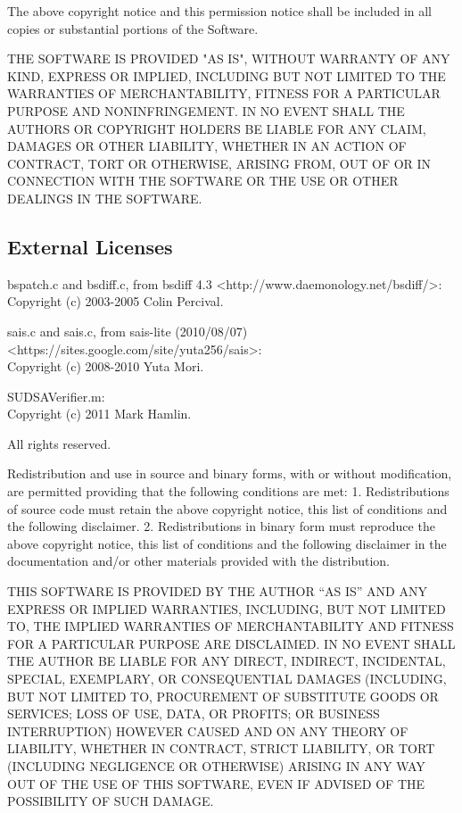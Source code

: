 \documentclass[parskip=half]{scrartcl}
\begin{document}
The above copyright notice and this permission notice shall be included in all
copies or substantial portions of the Software.

THE SOFTWARE IS PROVIDED "AS IS", WITHOUT WARRANTY OF ANY KIND, EXPRESS OR
IMPLIED, INCLUDING BUT NOT LIMITED TO THE WARRANTIES OF MERCHANTABILITY, FITNESS
FOR A PARTICULAR PURPOSE AND NONINFRINGEMENT. IN NO EVENT SHALL THE AUTHORS OR
COPYRIGHT HOLDERS BE LIABLE FOR ANY CLAIM, DAMAGES OR OTHER LIABILITY, WHETHER
IN AN ACTION OF CONTRACT, TORT OR OTHERWISE, ARISING FROM, OUT OF OR IN
CONNECTION WITH THE SOFTWARE OR THE USE OR OTHER DEALINGS IN THE SOFTWARE.


\subsection*{External Licenses}

bspatch.c and bsdiff.c, from bsdiff 4.3 <http://www.daemonology.net/bsdiff/>:\\
Copyright (c) 2003-2005 Colin Percival.

sais.c and sais.c, from sais-lite (2010/08/07) <https://sites.google.com/site/yuta256/sais>:\\
Copyright (c) 2008-2010 Yuta Mori.

SUDSAVerifier.m:\\
Copyright (c) 2011 Mark Hamlin.

All rights reserved.

Redistribution and use in source and binary forms, with or without
modification, are permitted providing that the following conditions
are met:
1. Redistributions of source code must retain the above copyright
   notice, this list of conditions and the following disclaimer.
2. Redistributions in binary form must reproduce the above copyright
   notice, this list of conditions and the following disclaimer in the
   documentation and/or other materials provided with the distribution.

THIS SOFTWARE IS PROVIDED BY THE AUTHOR ``AS IS'' AND ANY EXPRESS OR
IMPLIED WARRANTIES, INCLUDING, BUT NOT LIMITED TO, THE IMPLIED
WARRANTIES OF MERCHANTABILITY AND FITNESS FOR A PARTICULAR PURPOSE
ARE DISCLAIMED.  IN NO EVENT SHALL THE AUTHOR BE LIABLE FOR ANY
DIRECT, INDIRECT, INCIDENTAL, SPECIAL, EXEMPLARY, OR CONSEQUENTIAL
DAMAGES (INCLUDING, BUT NOT LIMITED TO, PROCUREMENT OF SUBSTITUTE GOODS
OR SERVICES; LOSS OF USE, DATA, OR PROFITS; OR BUSINESS INTERRUPTION)
HOWEVER CAUSED AND ON ANY THEORY OF LIABILITY, WHETHER IN CONTRACT,
STRICT LIABILITY, OR TORT (INCLUDING NEGLIGENCE OR OTHERWISE) ARISING
IN ANY WAY OUT OF THE USE OF THIS SOFTWARE, EVEN IF ADVISED OF THE
POSSIBILITY OF SUCH DAMAGE.
\end{document}
